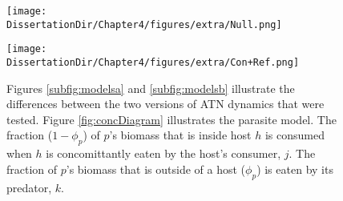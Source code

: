 \documentclass[/home/nkappler/Research/Dissertation/dissertation.tex]{subfiles}
\begin{document}
\begin{bibunit}
\begin{figure}
    \centering
    \begin{minipage}{.45\textwidth}
    \centering
    \texttt{[image: \\DissertationDir/Chapter4/figures/extra/Null.png]}%
\end{minipage}%
    \begin{minipage}{.45\textwidth}
    \centering
    \texttt{[image: \\DissertationDir/Chapter4/figures/extra/Con+Ref.png]}%
\end{minipage}%
\vspace{.2in}  
    \caption[Cartoon of dynamical models]{Figures
            \ref{subfig:modelsa} and \ref{subfig:modelsb} illustrate the
            differences between the two versions of ATN dynamics that were
            tested.  Figure \ref{fig:concDiagram} illustrates the parasite
            model. The fraction ($1-\phi_p$) of $p$'s biomass that is inside
            host $h$ is consumed when $h$ is concomittantly eaten by the host's
            consumer, $j$.  The fraction of $p$'s biomass that is outside of a
            host ($\phi_p$) is eaten by its predator, $k$.
    \label{fig:models}}
\end{figure}

%



\end{bibunit}
\end{document}
